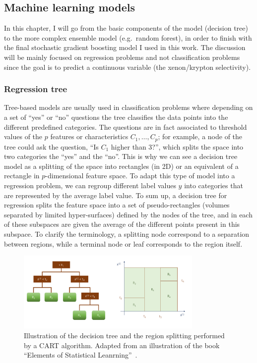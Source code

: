\documentclass[main]{subfiles}
\begin{document}
\subsection{Machine learning models}\label{sct:model}

In this chapter, I will go from the basic components of the model (decision tree) to the more complex ensemble model (e.g.\ random forest), in order to finish with the final stochastic gradient boosting model I used in this work. The discussion will be mainly focused on regression problems and not classification problems since the goal is to predict a continuous variable (the xenon/krypton selectivity).

\subsubsection{Regression tree}

Tree-based models are usually used in classification problems where depending on a set of ``yes'' or ``no'' questions the tree classifies the data points into the different predefined categories. The questions are in fact associated to threshold values of the $p$ features or characteristics $C_1,\ldots,C_p$; for example, a node of the tree could ask the question, ``Is $C_1$ higher than $3$?'', which splits the space into two categories the ``yes'' and the ``no''. This is why we can see a decision tree model as a splitting of the space into rectangles (in 2D) or an equivalent of a rectangle in $p$-dimensional feature space. To adapt this type of model into a regression problem, we can regroup different label values $y$ into categories that are represented by the average label value. To sum up, a decision tree for regression splits the feature space into a set of pseudo-rectangles (volumes separated by limited hyper-surfaces) defined by the nodes of the tree, and in each of these subspaces are given the average of the different points present in this subspace. To clarify the terminology, a splitting node correspond to a separation between regions, while a terminal node or leaf corresponds to the region itself.

\begin{figure}[ht]
  \centering
  \includegraphics[width=0.8\textwidth]{figures/4-ml/decision_tree.pdf}
  \caption{Illustration of the decision tree and the region splitting performed by a CART\autocite{Breiman_2017} algorithm. Adapted from an illustration of the book ``Elements of Statistical Leanrning''~\cite{Hastie_2009}.}\label{fgr:tree}
\end{figure}
\end{document}
